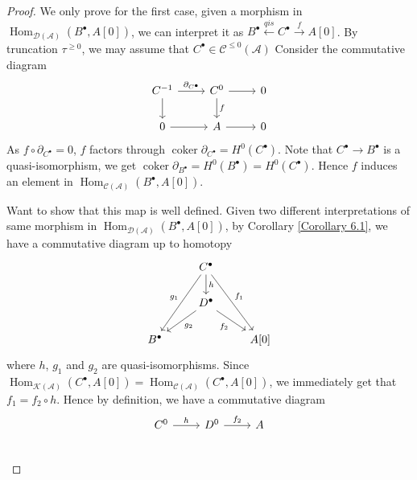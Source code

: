 \documentclass{ctexart}
\renewcommand{\hom}{\operatorname{Hom}}
\newcommand{\coker}{\operatorname{coker}}
\begin{document}
\begin{proof}
    We only prove for the first case, given a morphism in $\hom_{\mathcal{D}(\mathscr{A})}(B^{\bullet}, A[0])$,
    we can interpret it as $B^{\bullet} \overset{qis}{\leftarrow} C^{\bullet} \overset{f}{\rightarrow} A[0]$.
    By truncation $\tau^{\ge 0}$, we may assume that $C^{\bullet}\in \mathcal{C}^{\le 0}(\mathscr{A})$
    Consider the commutative diagram
    \begin{equation}
        \begin{tikzcd}
            C^{-1} \arrow[r, "\partial_{C^{\bullet}}"] \arrow[d] &
            C^{0} \arrow[r] \arrow[d, "f"] &
            0 \\
            0 \arrow[r] &
            A \arrow[r] &
            0
        \end{tikzcd}
    \end{equation}
    As $f \circ \partial_{C^{\bullet}} = 0$, $f$ factors through $\coker \partial_{C^{\bullet}} = H^{0}(C^{\bullet})$.
    Note that $C^{\bullet} \rightarrow B^{\bullet}$ is a quasi-isomorphism, we get $\coker \partial_{B^{\bullet}} = H^{0}(B^{\bullet}) = H^{0}(C^{\bullet})$.
    Hence $f$ induces an element in $\hom_{\mathcal{C}(\mathscr{A})}(B^{\bullet}, A[0])$.
    \par
    Want to show that this map is well defined.
    Given two different interpretations of same morphism in $\hom_{\mathcal{D}(\mathscr{A})}(B^{\bullet}, A[0])$,
    by Corollary \ref{Corollary 6.1}, we have a commutative diagram up to homotopy
    \begin{equation}
        \begin{tikzcd}
            & C^{\bullet} \arrow[ddr, "f_{1}"] \arrow[d, "h"] \arrow[ddl, "g_{1}" swap] & \\
            & D^{\bullet} \arrow[dr, "f_{2}" swap] \arrow[dl, "g_{2}"] & \\
            B^{\bullet} &&
            A[0]
        \end{tikzcd}
    \end{equation}
    where $h$, $g_{1}$ and $g_{2}$ are quasi-isomorphisms.
    Since $\hom_{\mathcal{K}(\mathscr{A})}(C^{\bullet}, A[0]) = \hom_{\mathcal{C}(\mathscr{A})}(C^{\bullet}, A[0])$,
    we immediately get that $f_{1} = f_{2} \circ h$.
    Hence by definition, we have a commutative diagram
    \begin{equation}
        \begin{tikzcd}
            C^{0} \arrow[r, "h"] &
            D^{0} \arrow[r, "f_{2}"] &
            A \\

\end{tikzcd}
\end{equation}
\end{proof}
\end{document}
